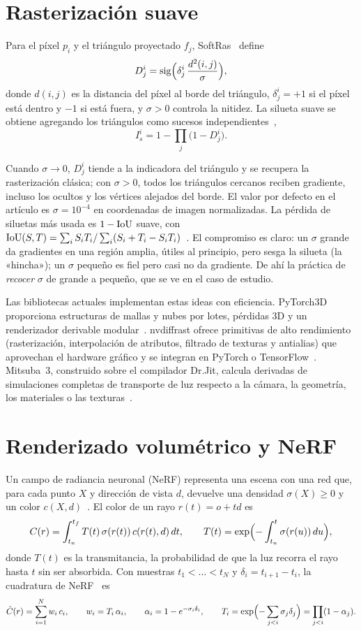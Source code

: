 \section{Rasterización suave}

\begin{definicion}\label{def:softras}
Para el píxel $p_i$ y el triángulo proyectado $f_j$, SoftRas~\cite[§3.2]{softras} define
\[
D_j^i=\operatorname{sig}\Bigl(\delta_j^i\,\frac{d^2(i,j)}{\sigma}\Bigr),
\]
donde $d(i,j)$ es la distancia del píxel al borde del triángulo, $\delta_j^i=+1$ si el píxel está dentro y $-1$ si está fuera, y $\sigma>0$ controla la nitidez. La silueta suave se obtiene agregando los triángulos como sucesos independientes~\cite[§3.3]{softras},
\[
I_s^i=1-\prod_j\bigl(1-D_j^i\bigr).
\]
\end{definicion}

Cuando $\sigma\to 0$, $D_j^i$ tiende a la indicadora del triángulo y se recupera la rasterización clásica; con $\sigma>0$, todos los triángulos cercanos reciben gradiente, incluso los ocultos y los vértices alejados del borde. El valor por defecto en el artículo es $\sigma=10^{-4}$ en coordenadas de imagen normalizadas. La pérdida de siluetas más usada es $1-\operatorname{IoU}$ suave, con $\operatorname{IoU}(S,T)=\sum_iS_iT_i/\sum_i(S_i+T_i-S_iT_i)$~\cite[§4.1]{softras}. El compromiso es claro: un $\sigma$ grande da gradientes en una región amplia, útiles al principio, pero sesga la silueta (la «hincha»); un $\sigma$ pequeño es fiel pero casi no da gradiente. De ahí la práctica de \emph{recocer} $\sigma$ de grande a pequeño, que se ve en el caso de estudio.

Las bibliotecas actuales implementan estas ideas con eficiencia. PyTorch3D proporciona estructuras de mallas y nubes por lotes, pérdidas 3D y un renderizador derivable modular~\cite{pytorch3d}. nvdiffrast ofrece primitivas de alto rendimiento (rasterización, interpolación de atributos, filtrado de texturas y antialias) que aprovechan el hardware gráfico y se integran en PyTorch o TensorFlow~\cite{nvdiffrast}. Mitsuba~3, construido sobre el compilador Dr.Jit, calcula derivadas de simulaciones completas de transporte de luz respecto a la cámara, la geometría, los materiales o las texturas~\cite{mitsuba3}.

\section{Renderizado volumétrico y NeRF}

Un campo de radiancia neuronal (NeRF) representa una escena con una red que, para cada punto $X$ y dirección de vista $d$, devuelve una densidad $\sigma(X)\ge 0$ y un color $c(X,d)$~\cite{nerf}. El color de un rayo $r(t)=o+td$ es
\[
C(r)=\int_{t_n}^{t_f}T(t)\,\sigma(r(t))\,c(r(t),d)\,dt,\qquad T(t)=\exp\Bigl(-\int_{t_n}^{t}\sigma(r(u))\,du\Bigr),
\]
donde $T(t)$ es la transmitancia, la probabilidad de que la luz recorra el rayo hasta $t$ sin ser absorbida. Con muestras $t_1<\dots<t_N$ y $\delta_i=t_{i+1}-t_i$, la cuadratura de NeRF~\cite[§4]{nerf} es
\[
\hat C(r)=\sum_{i=1}^N w_i\,c_i,\qquad w_i=T_i\,\alpha_i,\qquad \alpha_i=1-e^{-\sigma_i\delta_i},\qquad T_i=\exp\Bigl(-\sum_{j<i}\sigma_j\delta_j\Bigr)=\prod_{j<i}(1-\alpha_j).
\]

